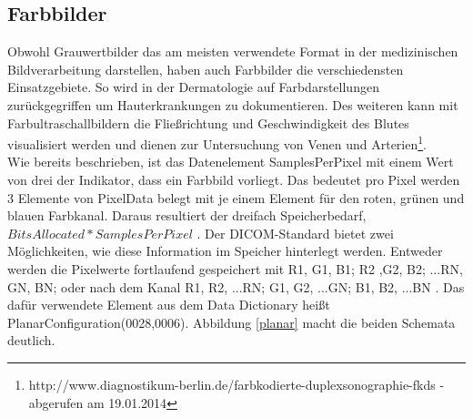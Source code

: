 \FloatBarrier
\subsection{Farbbilder} \label{color_images}
Obwohl Grauwertbilder das am meisten verwendete Format in der medizinischen Bildverarbeitung darstellen, haben auch Farbbilder die verschiedensten Einsatzgebiete. So wird in der Dermatologie auf Farbdarstellungen zurückgegriffen um Hauterkrankungen zu dokumentieren\cite[2.2.3.2]{handels:mbv}. Des weiteren kann mit Farbultraschallbildern die Fließrichtung und Geschwindigkeit des Blutes visualisiert werden und dienen zur Untersuchung von Venen und Arterien\footnote{http://www.diagnostikum-berlin.de/farbkodierte-duplexsonographie-fkds - abgerufen am 19.01.2014}.\\
Wie bereits beschrieben, ist das Datenelement SamplesPerPixel mit einem Wert von drei der Indikator, dass ein Farbbild vorliegt. Das bedeutet pro Pixel werden 3 Elemente von PixelData belegt mit je einem Element für den roten, grünen und blauen Farbkanal. Daraus resultiert der dreifach Speicherbedarf, $BitsAllocated * SamplesPerPixel$ \cite[C.7.6.3.1.1]{dicom:iod}. Der DICOM-Standard bietet zwei Möglichkeiten, wie diese Information im Speicher hinterlegt werden. Entweder werden die Pixelwerte fortlaufend gespeichert mit R1, G1, B1; R2 ,G2, B2; ...RN, GN, BN; oder nach dem Kanal R1, R2, ...RN; G1, G2, ...GN; B1, B2, ...BN \cite[C.7.6.3.1.3]{dicom:iod}. Das dafür verwendete Element  aus dem Data Dictionary heißt PlanarConfiguration(0028,0006). Abbildung \ref{planar} macht die beiden Schemata deutlich.

